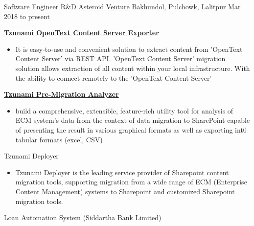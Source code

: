

\begin{cventries}
\cventry
{Software Engineer R\&D} %
{\href{https://asteroidventure.com/}{Asteroid Venture}} %
{Bakhundol, Pulchowk, Lalitpur} %
{Mar 2018 to present} %
{
	\begin{cvitems} %
		\item {\textbf{ \href{https://tzunami.com/opentext-content-server/}{Tzunami OpenText Content Server Exporter}}}
		\begin{itemize}
			\item {It is easy-to-use and convenient solution to extract content from 'OpenText Content Server' via REST API. 'OpenText Content Server' migration solution allows extraction of all content within your local infrastructure. With the ability to connect remotely to the 'OpenText Content Server'}
		\end{itemize}
		\item {\textbf{ \href{https://tzunami.com/pre-migration-analysis/}{Tzunami Pre-Migration Analyzer}}}
		\begin{itemize}
			\item {build a comprehensive, extensible, feature-rich utility tool for analysis of ECM system's data from the context of data migration to SharePoint capable of presenting the result in various graphical formats as well as exporting int0 tabular formats (excel, CSV)}
		\end{itemize}
		\item {Tzunami Deployer}
		\begin{itemize}
			\item {Tzunami Deployer is the leading service provider of Sharepoint content migration tools, supporting migration from a wide range of ECM (Enterprise Content Management) systems to Sharepoint and customized Sharepoint migration tools.}
		\end{itemize}
		\item {Loan Automation System (Siddartha Bank Limited)}
		\begin{itemize}

\end{itemize}
\end{cvitems}}
\end{cventries}
